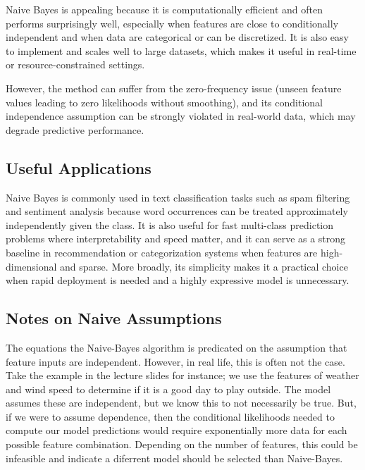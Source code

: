 \documentclass{article}
\begin{document}
Naive Bayes is appealing because it is computationally efficient and often performs surprisingly well, especially when features are close to conditionally independent and when data are categorical or can be discretized. It is also easy to implement and scales well to large datasets, which makes it useful in real-time or resource-constrained settings. 

However, the method can suffer from the zero-frequency issue (unseen feature values leading to zero likelihoods without smoothing), and its conditional independence assumption can be strongly violated in real-world data, which may degrade predictive performance.



\subsection{Useful Applications}

Naive Bayes is commonly used in text classification tasks such as spam filtering and sentiment analysis because word occurrences can be treated approximately independently given the class. It is also useful for fast multi-class prediction problems where interpretability and speed matter, and it can serve as a strong baseline in recommendation or categorization systems when features are high-dimensional and sparse. More broadly, its simplicity makes it a practical choice when rapid deployment is needed and a highly expressive model is unnecessary.


\subsection{Notes on Naive Assumptions}
The equations the Naive-Bayes algorithm is predicated on the assumption that feature inputs are independent. However, in real life, this is often not the case. Take the example in the lecture slides for instance; we use the features of weather and wind speed to determine if it is a good day to play outside. The model assumes these are independent, but we know this to not necessarily be true. But, if we were to assume dependence, then the conditional likelihoods needed to compute our model predictions would require exponentially more data for each possible feature combination. Depending on the number of features, this could be infeasible and indicate a diferrent model should be selected than Naive-Bayes.  
\end{document}
